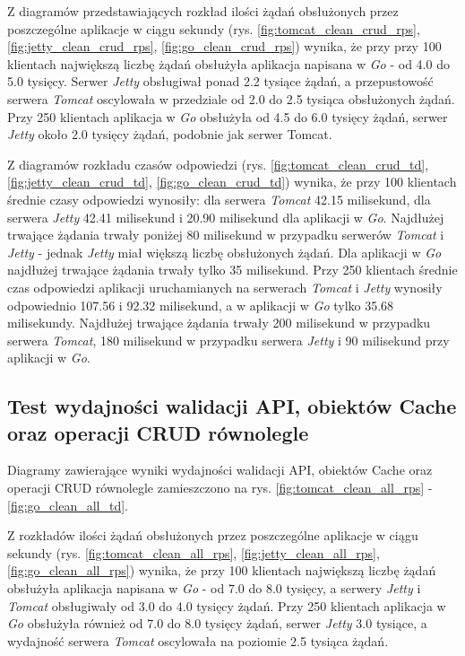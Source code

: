 Z diagramów przedstawiających rozkład ilości żądań obsłużonych przez poszczególne aplikacje w ciągu sekundy (rys. \ref{fig:tomcat_clean_crud_rps}, \ref{fig:jetty_clean_crud_rps}, \ref{fig:go_clean_crud_rps}) wynika, że przy przy 100 klientach największą liczbę żądań obsłużyła aplikacja napisana w \textsl{Go} - od 4.0 do 5.0 tysięcy. Serwer \textsl{Jetty} obsługiwał ponad 2.2 tysiące żądań, a przepustowość serwera \textsl{Tomcat} oscylowała w przedziale od 2.0 do 2.5 tysiąca obsłużonych żądań. Przy 250 klientach aplikacja w \textsl{Go} obsłużyła od 4.5 do 6.0 tysięcy żądań, serwer \textsl{Jetty} około 2.0 tysięcy żądań, podobnie jak serwer Tomcat.

Z diagramów rozkładu czasów odpowiedzi (rys. \ref{fig:tomcat_clean_crud_td}, \ref{fig:jetty_clean_crud_td}, \ref{fig:go_clean_crud_td}) wynika, że przy 100 klientach średnie czasy odpowiedzi wynosiły: dla serwera \textsl{Tomcat} 42.15  milisekund, dla serwera \textsl{Jetty} 42.41  milisekund i 20.90 milisekund dla aplikacji w \textsl{Go}.  Najdłużej trwające żądania trwały poniżej 80 milisekund w przypadku serwerów \textsl{Tomcat} i \textsl{Jetty} - jednak \textsl{Jetty} miał większą liczbę obsłużonych żądań. Dla aplikacji w \textsl{Go} najdłużej trwające żądania trwały tylko 35 milisekund. Przy 250 klientach średnie czas odpowiedzi aplikacji uruchamianych na serwerach \textsl{Tomcat} i \textsl{Jetty}  wynosiły  odpowiednio 107.56 i 92.32 milisekund, a w aplikacji w \textsl{Go} tylko 35.68 milisekundy. Najdłużej trwające żądania trwały 200 milisekund w przypadku serwera \textsl{Tomcat}, 180 milisekund w przypadku serwera \textsl{Jetty} i 90 milisekund przy aplikacji w \textsl{Go}.


\clearpage

\subsection{Test wydajności walidacji API, obiektów Cache oraz operacji CRUD równolegle}
Diagramy zawierające wyniki wydajności walidacji API, obiektów Cache oraz operacji CRUD równolegle zamieszczono na rys. \ref{fig:tomcat_clean_all_rps} - \ref{fig:go_clean_all_td}.                                                                  

Z rozkładów ilości żądań obsłużonych przez poszczególne aplikacje w ciągu sekundy (rys. \ref{fig:tomcat_clean_all_rps}, \ref{fig:jetty_clean_all_rps}, \ref{fig:go_clean_all_rps}) wynika, że przy 100 klientach największą liczbę żądań obsłużyła aplikacja napisana w \textsl{Go} - od 7.0 do 8.0 tysięcy, a serwery \textsl{Jetty} i \textsl{Tomcat} obsługiwały od 3.0 do 4.0  tysięcy żądań. Przy 250 klientach aplikacja w \textsl{Go} obsłużyła również od 7.0 do 8.0 tysięcy żądań, serwer \textsl{Jetty} 3.0 tysiące, a wydajność serwera \textsl{Tomcat} oscylowała na poziomie 2.5 tysiąca żądań. 
 
